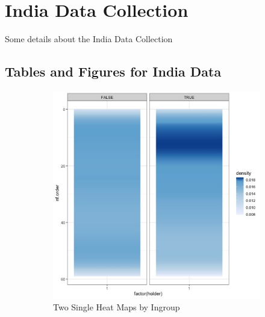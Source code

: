\documentclass[12pt,letterpaper]{article}
\begin{document}
\section{India Data Collection}\label{app:india}
Some details about the India Data Collection

\subsection{Tables and Figures for India Data}

\begin{figure}[ht]
\caption{NF Ingroup Posts Higher}
\label{fig:nf_bygroup}
    \begin{subfigure}{.5\textwidth} 
        \centering
        \includegraphics[width=1\linewidth]{Output/Graphs/Audit/Heatmaps/India NF nf rank by ingroup - smooth.jpg}  
        \caption{Two Single Heat Maps by Ingroup}
        \label{fig:nf_bygroup_hm}
        \end{subfigure}
    \begin{subfigure}{.5\textwidth}
        \centering

\end{subfigure}
\end{figure}
\end{document}

